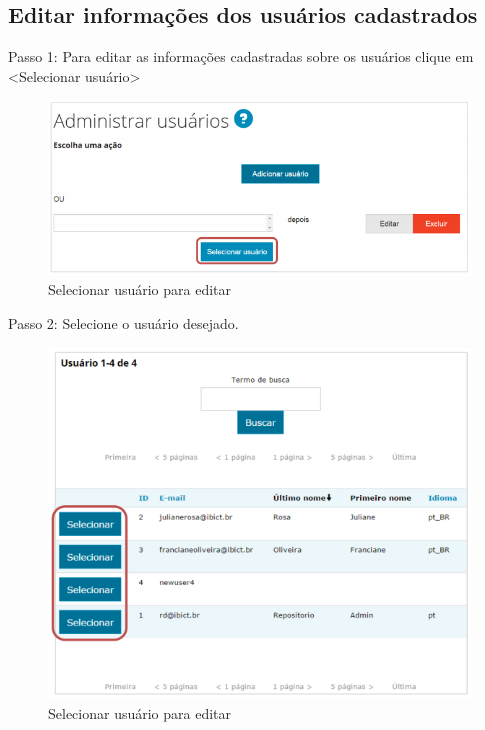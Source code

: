 \documentclass[12pt,hidelinks]{article}
\begin{document}
\newpage

    \subsection{Editar informações dos usuários cadastrados}
    
    Passo 1: Para editar as informações cadastradas sobre os usuários clique em <Selecionar usuário>
    
    \begin{figure}[!htp]
                \centering
                \includegraphics[scale=0.8]{figura/Figura59.png}
                \caption{Selecionar usuário para editar}
            \label{Rotulo}
        \end{figure}

    Passo 2: Selecione o usuário desejado.
    
    \begin{figure}[!htp]
                \centering
                \includegraphics[scale=0.8]{figura/Figura60.png}
                \caption{Selecionar usuário para editar}
            \label{Rotulo}
        \end{figure}
\end{document}

